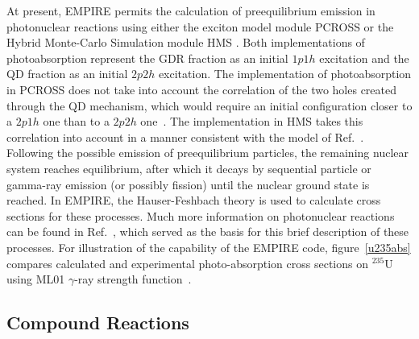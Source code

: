 At present, EMPIRE permits the calculation of preequilibrium emission in
photonuclear reactions using either the exciton model module PCROSS%
 or the Hybrid Monte-Carlo Simulation module HMS%
. Both implementations of photoabsorption represent the GDR
fraction as an initial $1p1h$ excitation and the QD fraction as an initial $%
2p2h$ excitation. The implementation of photoabsorption in PCROSS does not
take into account the correlation of the two holes created through the QD
mechanism, which would require an initial configuration closer to a $2p1h$
one than to a $2p2h$ one~\cite{PHNuc}. The implementation in HMS takes this
correlation into account in a manner consistent with the model of Ref.~\cite%
{chadQD}. Following the possible emission of preequilibrium particles, the
remaining nuclear system reaches equilibrium, after which it decays by
sequential particle or gamma-ray emission (or possibly fission) until the
nuclear ground state is reached. In EMPIRE, the Hauser-Feshbach theory is
used to calculate cross sections for these processes. Much more information
on photonuclear reactions can be found in Ref.~\cite{PHNuc}, which served as
the basis for this brief description of these processes. For illustration of
the capability of the EMPIRE code, figure~\ref{u235abs} compares calculated
and experimental photo-absorption cross sections on $^{235}$U using ML01 $%
\gamma$-ray strength function~\cite{mike2}.


\subsection{Compound Reactions}

